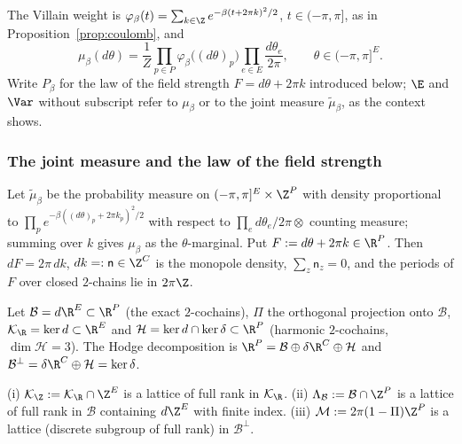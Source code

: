 The Villain weight is $\varphi_\beta(t)=\sum_{k\in\Z}e^{-\beta(t+2\pi k)^2
/2}$, $t\in(-\pi,\pi]$, as in Proposition~\ref{prop:coulomb}, and
\[
\mu_\beta(d\theta)=\frac1Z\prod_{p\in P}\varphi_\beta\bigl((d\theta)_p
\bigr)\prod_{e\in E}\frac{d\theta_e}{2\pi},\qquad\theta\in(-\pi,\pi]^E .
\]
Write $P_\beta$ for the law of the field strength $F=d\theta+2\pi k$
introduced below; $\E$ and $\Var$ without subscript refer to $\mu_\beta$
or to the joint measure $\tilde\mu_\beta$, as the context shows.

\subsubsection{The joint measure and the law of the field strength}
\label{rM3:duality}

Let $\tilde\mu_\beta$ be the probability measure on $(-\pi,\pi]^E\times
\Z^P$ with density proportional to $\prod_{p}e^{-\beta((d\theta)_p+2\pi
k_p)^2/2}$ with respect to $\prod_e d\theta_e/2\pi\otimes$ counting
measure; summing over $k$ gives $\mu_\beta$ as the $\theta$-marginal. Put
$F:=d\theta+2\pi k\in\R^P$. Then $dF=2\pi\,dk$, $dk=:\mathsf n\in\Z^C$ is
the monopole density, $\sum_z\mathsf n_z=0$, and the periods of $F$ over
closed $2$-chains lie in $2\pi\Z$.

Let $\mathcal B=d\R^E\subset\R^P$ (the exact $2$-cochains), $\Pi$ the
orthogonal projection onto $\mathcal B$, $\mathcal K_\R=\ker d\subset\R^E$
and $\mathcal H=\ker d\cap\ker\delta\subset\R^P$ (harmonic $2$-cochains,
$\dim\mathcal H=3$). The Hodge decomposition is $\R^P=\mathcal B\oplus
\delta\R^C\oplus\mathcal H$ and $\mathcal B^\perp=\delta\R^C\oplus\mathcal
H=\ker\delta$.

\begin{lemma}\label{rM3:lattices}
\textup{(i)} $\mathcal K_\Z:=\mathcal K_\R\cap\Z^E$ is a lattice of full
rank in $\mathcal K_\R$. \textup{(ii)} $\Lambda_{\mathcal B}:=\mathcal B
\cap\Z^P$ is a lattice of full rank in $\mathcal B$ containing $d\Z^E$ with
finite index. \textup{(iii)} $\mathcal M:=2\pi(1-\Pi)\Z^P$ is a lattice
(discrete subgroup of full rank) in $\mathcal B^\perp$.
\end{lemma}

